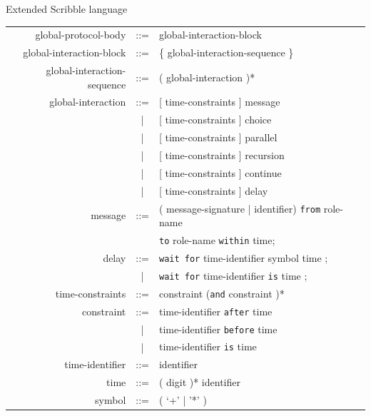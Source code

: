 \documentclass[8 pt]{beamer}
\begin{document}
\begin{frame}{Extended Scribble language}
\begin{center}
\begin{tabular}{rcl}
global-protocol-body & ::= & global-interaction-block \\
global-interaction-block & ::= & \{ global-interaction-sequence \}  \\
global-interaction-sequence & ::= & ( global-interaction )*  \\
global-interaction & ::= & [ time-constraints ] message  \\
 & | & [ time-constraints ] choice  \\
 & | & [ time-constraints ] parallel \\
 & | & [ time-constraints ] recursion \\  
 & | & [ time-constraints ] continue  \\
 & | & [ time-constraints ] delay\\
message & ::= & ( message-signature | identifier)  \texttt{from} role-name  \\
&&\texttt{to} role-name  \texttt{within} time;\\
delay & ::= &  \texttt{wait for} time-identifier symbol time ;\\
 & | &  \texttt{wait for} time-identifier \texttt{is} time ; \\
time-constraints & ::= &  constraint (\texttt{and} constraint )* \\
constraint & ::= &  time-identifier  \texttt{after} time   \\
 & | &  time-identifier \texttt{before} time \\
 & | &  time-identifier \texttt{is} time \\
time-identifier & ::= &  identifier \\
time & ::= &   ( digit  )* identifier \\
symbol &  ::= &  ( ‘+’ | ’*’ )\\
\end{tabular}
\end{center}
\end{frame}
\end{document}

